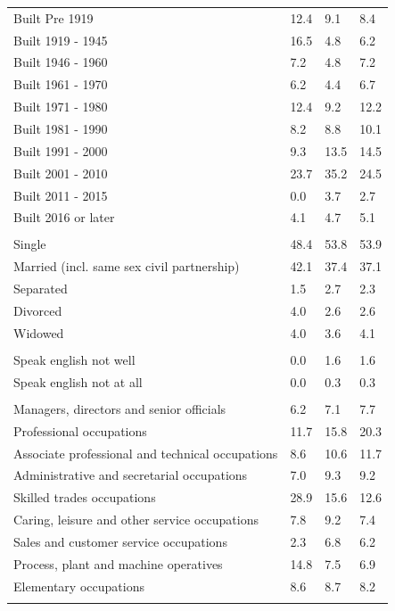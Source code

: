 \documentclass{article}
\begin{document}
\begin{table}[h]
\begin{tabular}{KTTT}
    \hline
Built Pre 1919 & 12.4&  9.1&  8.4\\
Built 1919 - 1945 & 16.5&  4.8&  6.2\\
Built  1946 - 1960 & 7.2& 4.8& 7.2\\
Built  1961 - 1970 & 6.2& 4.4& 6.7\\
Built  1971 - 1980 & 12.4&  9.2& 12.2\\
Built  1981 - 1990 &  8.2&  8.8& 10.1\\
Built  1991 - 2000 &  9.3& 13.5& 14.5\\
Built  2001 - 2010 & 23.7& 35.2& 24.5\\
Built  2011 - 2015 & 0.0& 3.7& 2.7\\
Built  2016 or later & 4.1& 4.7& 5.1\\
\hline
    \\
    \hline
Single & 48.4& 53.8& 53.9\\
Married (incl. same sex civil partnership) & 42.1& 37.4& 37.1\\
Separated  & 1.5& 2.7& 2.3\\
Divorced  & 4.0& 2.6& 2.6\\
Widowed & 4.0& 3.6& 4.1\\
\hline
    \\ 
    \hline
Speak english not well & 0.0& 1.6& 1.6\\
Speak english not at all & 0.0& 0.3& 0.3\\
\hline
    \\
    \hline
Managers, directors and senior officials & 6.2& 7.1& 7.7\\
Professional occupations & 11.7& 15.8& 20.3\\
Associate professional and technical occupations &  8.6& 10.6& 11.7\\
Administrative and secretarial occupations & 7.0& 9.3& 9.2\\
Skilled trades occupations & 28.9& 15.6& 12.6\\
Caring, leisure and other service occupations & 7.8& 9.2& 7.4\\
Sales and customer service occupations & 2.3& 6.8& 6.2\\
Process, plant and machine operatives & 14.8&  7.5&  6.9\\
Elementary occupations & 8.6& 8.7& 8.2\\
\hline
\end{tabular}
\end{table}
\end{document}
